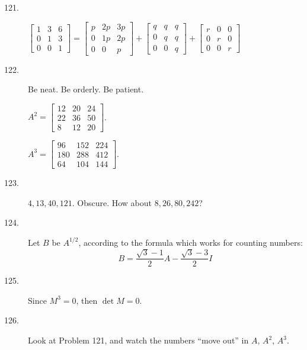 \documentclass{article}
\begin{document}
\begin{description}
  \item[121.] $\begin{bmatrix} 1 & 3 & 6 \\ 0 & 1 & 3 \\ 0 & 0 & 1 \end{bmatrix}  =  \begin{bmatrix} p & 2p & 3p \\ 0 & 1p & 2p \\ 0 & 0 & p \end{bmatrix}  +  \begin{bmatrix} q & q & q \\ 0 & q & q \\ 0 & 0 & q \end{bmatrix}  +  \begin{bmatrix} r & 0 & 0 \\ 0 & r & 0 \\ 0 & 0 & r \end{bmatrix}$

  \item[122.] Be neat. Be orderly. Be patient.

    $A^2 = \begin{bmatrix} 12 & 20 & 24 \\ 22 & 36 & 50 \\ 8 & 12 & 20 \end{bmatrix}$.

    $A^3 = \begin{bmatrix} 96 & 152 & 224 \\ 180 & 288 & 412 \\ 64 & 104 & 144 \end{bmatrix}$.

  \item[123.] $4, 13, 40, 121$. Obscure. How about $8, 26, 80, 242$?

  \item[124.] Let $B$ be $A^{1/2}$, according to the formula which works for counting numbers:
    \begin{equation*}
    B = \frac{\sqrt{3}-1}{2} A - \frac{\sqrt{3}-3}{2} I
    \end{equation*}

  \item[125.] Since $M^3 = 0$, then $\det M = 0$.

  \item[126.] Look at Problem 121, and watch the numbers ``move out'' in $A$, $A^2$, $A^3$.

\end{description}
\end{document}

